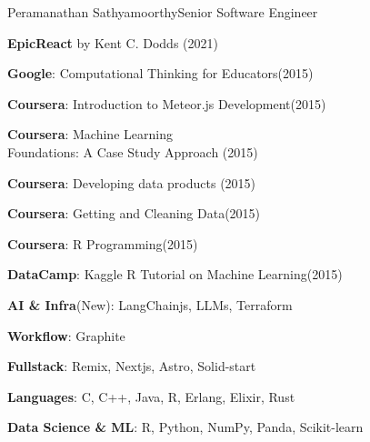 \documentclass{article}
\begin{document}
\begin{cv}[cvpicture]{Peramanathan Sathyamoorthy}{Senior Software Engineer}

\textbf{EpicReact} by Kent C. Dodds (2021)

\vspace{1em}

\textbf{Google}: Computational Thinking for Educators(2015)

\vspace{1em}

\textbf{Coursera}: Introduction to Meteor.js Development(2015)

\vspace{1em}

\textbf{Coursera}: Machine Learning \\ Foundations: A Case Study Approach (2015)

\vspace{1em}

\textbf{Coursera}: Developing data products (2015)

\vspace{1em}

\textbf{Coursera}: Getting and Cleaning Data(2015)

\vspace{1em}

\textbf{Coursera}: R Programming(2015)

\vspace{1em}

\textbf{DataCamp}: Kaggle R Tutorial on Machine Learning(2015)

\vspace{1em}


    \textbf{AI \& Infra}(New): LangChainjs, LLMs, Terraform

    \vspace{0.26em}

    \textbf{Workflow}: Graphite

    \vspace{0.26em}

    \textbf{Fullstack}: Remix, Nextjs, Astro, Solid-start

    \vspace{0.26em}

    \textbf{Languages}: C, C++, Java, R, Erlang, Elixir, Rust

    \vspace{0.26em}

    \textbf{Data Science \& ML}: R, Python, NumPy, Panda, Scikit-learn


\end{cv}
\end{document}
